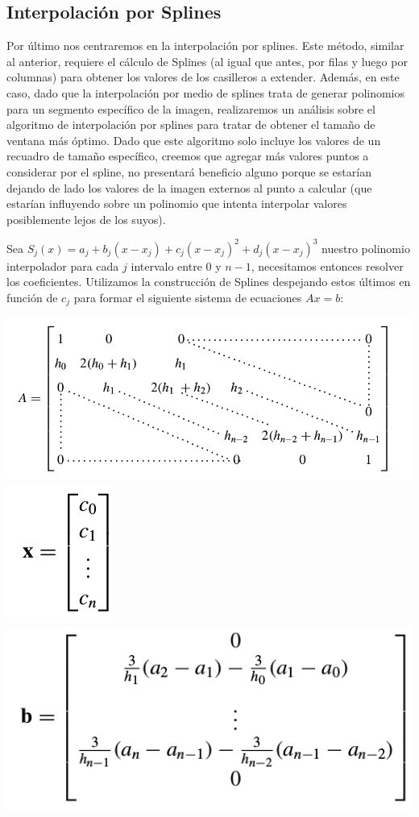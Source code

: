 \subsection{Interpolación por Splines}
Por último nos centraremos en la interpolación por splines. Este método, similar al anterior, requiere el cálculo de Splines (al igual que antes, por filas y luego por columnas) para obtener los valores de los casilleros a extender.
Además, en este caso, dado que la interpolación por medio de splines trata de generar polinomios para un segmento
específico de la imagen, realizaremos un análisis sobre el algoritmo de interpolación por splines para tratar de obtener el tamaño de ventana más óptimo. Dado que este algoritmo solo incluye los valores de un recuadro de tamaño específico, creemos que agregar más valores puntos a considerar por el spline, no presentará beneficio alguno porque se estarían dejando de lado los valores de la imagen externos al punto a calcular (que estarían influyendo sobre un polinomio que intenta interpolar valores posiblemente lejos de los suyos).

Sea $S_{j}(x) = a_{j} + b_{j}(x - x_{j}) + c_{j}(x - x_{j})^2 + d_{j}(x - x_{j})^3$ nuestro polinomio interpolador para cada $j$ intervalo entre $0$ y $n-1$, necesitamos entonces resolver los coeficientes. Utilizamos la construcción de Splines despejando estos últimos en función de $c_{j}$ para formar el siguiente sistema de ecuaciones $Ax = b$:

\begin{center}
\includegraphics[scale=0.50]{imagenes/A.png}
\includegraphics[scale=0.50]{imagenes/x.png}
\includegraphics[scale=0.50]{imagenes/b.png}
\end{center}

